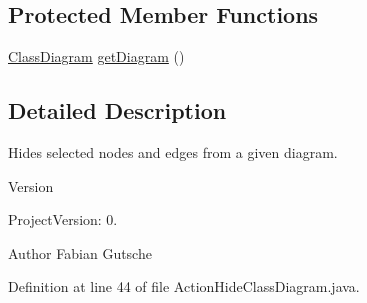 \subsection*{Protected Member Functions}
\begin{DoxyCompactItemize}
\item 
\hyperlink{classorg_1_1tzi_1_1use_1_1gui_1_1views_1_1diagrams_1_1classdiagram_1_1_class_diagram}{Class\-Diagram} \hyperlink{classorg_1_1tzi_1_1use_1_1gui_1_1views_1_1diagrams_1_1event_1_1_action_hide_class_diagram_a3b402c20ab2e7b1bb3a4aea0cc9d5c56}{get\-Diagram} ()
\end{DoxyCompactItemize}


\subsection{Detailed Description}
Hides selected nodes and edges from a given diagram.

\begin{DoxyVersion}{Version}

\end{DoxyVersion}
\begin{DoxyParagraph}{Project\-Version\-:}
0. 
\end{DoxyParagraph}
\begin{DoxyAuthor}{Author}
Fabian Gutsche 
\end{DoxyAuthor}


Definition at line 44 of file Action\-Hide\-Class\-Diagram.\-java.




